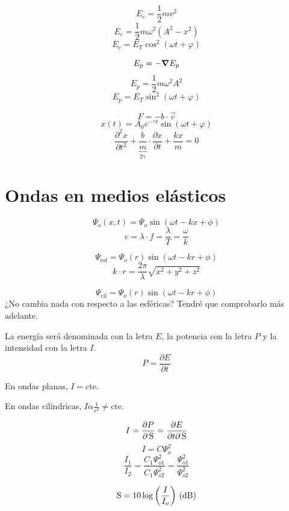 \documentclass[a4paper]{book}
\begin{document}
\begin{landscape}
\begin{fleqn}
\begin{multicols}{4}
		\[E_c=\frac{1}{2}mv^2\]
		\[E_c=\frac{1}{2}m\omega ^2\left( A^2-x^2 \right)\]
		\[E_c = E_T \cos^2{\left(\omega t + \varphi\right)}\]

		\[E_p = -\grad E_p\]
		\[E_p =\frac{1}{2}m\omega ^2A^2\]
		\[E_p = E_T \sin^2{\left(\omega t + \varphi \right)}\]

		\[F =-b\cdot \vec{v}\]
		\[x(t)=A_0e^{-\gamma t}\sin{\left(\omega t + \varphi\right)}\]
		\[\frac{\partial ^2x}{\partial t^2}+ \underbrace{\frac{b}{m}}_{2\gamma}\cdot \frac{\partial x}{\partial t}+\frac{kx}{m}=0\]

	\end{multicols}
\end{fleqn}

\newpage
\section{Ondas en medios elásticos}

\begin{fleqn}
	\begin{multicols}{4}
		\[\Psi _o(x,t)=\Psi _o\sin{\left(\omega t-kx+\phi\right)}\]
		\[v=\lambda\cdot f=\frac{\lambda}{T} =\frac{\omega}{k}\]

		\[\Psi _{\text{esf}}=\Psi _o(r)\sin{\left(\omega t-kr+\phi\right)}\]
		\[k\cdot r=\frac{2\pi}{\lambda}\sqrt{x^2+y^2+z^2}\]

		\[\Psi _{\text{cil}}=\Psi _o(r)\sin{\left(\omega t-kr+\phi\right)}\]
		¿No cambia nada con respecto a las esféricas? Tendré que comprobarlo más adelante.

		\vspace{5pt}

		\noindent La energía será denominada con la letra $E$, la potencia con la letra $P$ y la intensidad con la letra $I$.
		\[P=\frac{\partial E}{\partial t}\]

		\noindent En ondas planas, $I = \text{cte.}$

		\noindent En ondas cilíndricas, $ I\alpha\frac{1}{r^2} \not = \text{cte.}$

		\[I = \pdv{P}{\operatorname{S}} = \pdv{E}{t\partial \operatorname{S}}\]
		\[I = C \Psi_o^2\]
		\[\frac{I_1}{I_2}=\frac{C_1 \Psi _{o1}^2}{C_1 \Psi _{o2}^2}=\frac{\Psi _{o1}^2}{\Psi _{o2}^2}\]

		\[\operatorname{S} = 10 \log{\left( \frac{I}{I_o} \right)} \ (\operatorname{dB} )\]


\end{multicols}
\end{fleqn}
\end{landscape}
\end{document}

